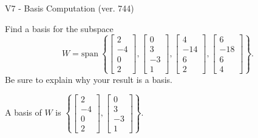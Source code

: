 \begin{exercise}
  \begin{exerciseTitle}V7 - Basis Computation (ver. 744)\end{exerciseTitle}
  \begin{exerciseStatement}
    Find a basis for the subspace 
\[W=\mathrm{span}\ \left\{\left[\begin{array}{r}
2 \\
-4 \\
0 \\
2
\end{array}\right] , \left[\begin{array}{r}
0 \\
3 \\
-3 \\
1
\end{array}\right] , \left[\begin{array}{r}
4 \\
-14 \\
6 \\
2
\end{array}\right] , \left[\begin{array}{r}
6 \\
-18 \\
6 \\
4
\end{array}\right]\right\}.\]
 Be sure to explain why your result is a basis.


  \end{exerciseStatement}
  \begin{exerciseAnswer}
   A basis of \(W\) is  \(\left\{\left[\begin{array}{r}
2 \\
-4 \\
0 \\
2
\end{array}\right] , \left[\begin{array}{r}
0 \\
3 \\
-3 \\
1
\end{array}\right]\right\}\).
  


  \end{exerciseAnswer}
\end{exercise}